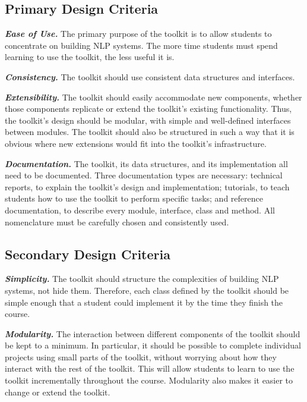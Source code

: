 \documentclass[11pt]{article}
\begin{document}
\subsection{Primary Design Criteria}

\noindent\textit{\textbf{Ease of Use.}} The primary purpose of the toolkit is
to allow students to concentrate on building NLP systems.  The more
time students must spend learning to use the toolkit, the less useful
it is.

\noindent\textit{\textbf{Consistency.}} The toolkit should use consistent data
structures and interfaces.

\noindent\textit{\textbf{Extensibility.}} The toolkit should easily
accommodate new components, whether those components replicate or
extend the toolkit's existing functionality.  Thus, the toolkit's
design should be modular, with simple and well-defined interfaces
between modules.  The toolkit should also be structured in such a way
that it is obvious where new extensions would fit into the toolkit's
infrastructure.

\noindent\textit{\textbf{Documentation.}} The toolkit, its data structures,
and its implementation all need to be documented.  Three documentation
types are necessary: technical reports, to explain the toolkit's
design and implementation; tutorials, to teach students how to use the
toolkit to perform specific tasks; and reference documentation, to
describe every module, interface, class and method.  All nomenclature
must be carefully chosen and consistently used.

\subsection{Secondary Design Criteria}

\noindent\textit{\textbf{Simplicity.}} The toolkit should structure the
complexities of building NLP systems, not hide them.  Therefore, each
class defined by the toolkit should be simple enough that a student
could implement it by the time they finish the course.

\noindent\textit{\textbf{Modularity.}} The interaction between different
components of the toolkit should be kept to a minimum.  In particular,
it should be possible to complete individual projects using small
parts of the toolkit, without worrying about how they interact with
the rest of the toolkit.  This will allow students to learn to use the
toolkit incrementally throughout the course.  Modularity also makes it
easier to change or extend the toolkit.
\end{document}
